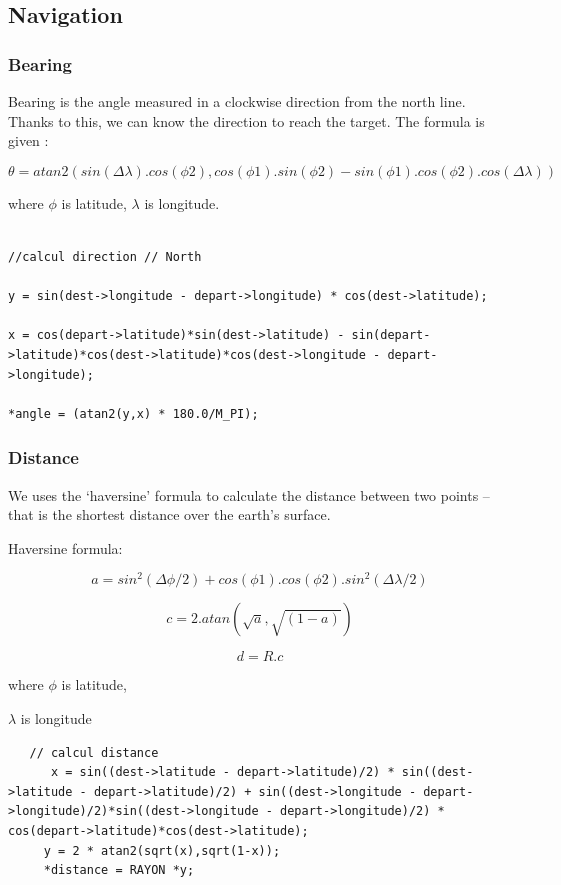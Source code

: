 \subsection{Navigation}

\subsubsection{Bearing}

Bearing is the angle measured in a clockwise direction from the north line.
Thanks to this, we can know the direction to reach the target. The formula is given :

$$ \theta = atan2( sin(\Delta\lambda).cos(\phi2), cos(\phi1).sin(\phi2) − sin(\phi1).cos(\phi2).cos(\Delta\lambda) )$$

where $ \phi $  is latitude, $ \lambda $ is longitude.\\

\begin{lstlisting}

//calcul direction // North

y = sin(dest->longitude - depart->longitude) * cos(dest->latitude);

x = cos(depart->latitude)*sin(dest->latitude) - sin(depart->latitude)*cos(dest->latitude)*cos(dest->longitude - depart->longitude);

*angle = (atan2(y,x) * 180.0/M_PI);

\end{lstlisting}

\subsubsection{Distance}


We uses the ‘haversine’ formula to calculate the distance between two points – that is the shortest distance over the earth’s surface.

Haversine formula:

$$ a = sin^2(\Delta\phi/2) + cos(\phi1).cos(\phi2).sin^2(\Delta\lambda/2) $$

$$ c = 2.atan(\sqrt{a}, \sqrt{(1−a)})$$ 

$$ d = R.c $$

where $ \phi $ is latitude,

$ \lambda $ is longitude

\begin{lstlisting}
   // calcul distance
      x = sin((dest->latitude - depart->latitude)/2) * sin((dest->latitude - depart->latitude)/2) + sin((dest->longitude - depart->longitude)/2)*sin((dest->longitude - depart->longitude)/2) * cos(depart->latitude)*cos(dest->latitude);
     y = 2 * atan2(sqrt(x),sqrt(1-x));
     *distance = RAYON *y;
\end{lstlisting}


